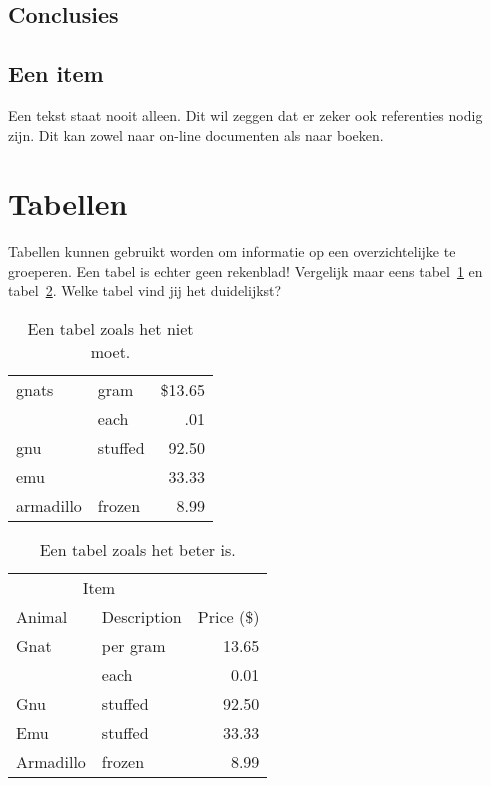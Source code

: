 \subsection{Conclusies}



\subsection{Een item}
Een tekst staat nooit alleen. Dit wil zeggen dat er zeker ook referenties
nodig zijn. Dit kan zowel naar on-line documenten\cite{wiki} als naar
boeken\cite{pratchett06:_good_omens}.

\section{Tabellen}
Tabellen kunnen gebruikt worden om informatie op een overzichtelijke te
groeperen. Een tabel is echter geen rekenblad! Vergelijk maar eens
tabel~\ref{tab:verkeerd} en tabel~\ref{tab:juist}. Welke tabel vind jij het
duidelijkst?

\begin{table}
  \centering
  \begin{tabular}{||l|lr||} \hline
    gnats     & gram      & \$13.65 \\ \cline{2-3}
              & each      & .01 \\ \hline
    gnu       & stuffed   & 92.50 \\ \cline{1-1} \cline{3-3}
    emu       &           & 33.33 \\ \hline
    armadillo & frozen    & 8.99 \\ \hline
  \end{tabular}
  \caption{Een tabel zoals het niet moet.}
  \label{tab:verkeerd}
\end{table}

\begin{table}
  \centering
  \begin{tabular}{@{}llr@{}} \toprule
    \multicolumn{2}{c}{Item} \\ \cmidrule(r){1-2}
    Animal    & Description & Price (\$)\\ \midrule
    Gnat      & per gram    & 13.65 \\
              & each        & 0.01 \\
    Gnu       & stuffed     & 92.50 \\
    Emu       & stuffed     & 33.33 \\
    Armadillo & frozen      & 8.99 \\ \bottomrule
  \end{tabular}
  \caption{Een tabel zoals het beter is.}
  \label{tab:juist}
\end{table}

